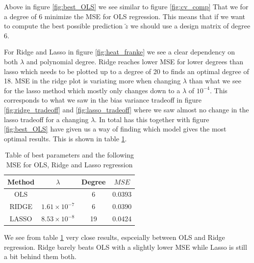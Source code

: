 \documentclass[12pt]{article}
\begin{document}
Above in figure \ref{fig:best_OLS} we see similar to figure \ref{fig:cv_comp} That we for a degree of 6 minimize the MSE for OLS regression. This means that if we want to compute the best possible prediction $\tilde{z}$ we should use a design matrix of degree 6.

For Ridge and Lasso in figure \ref{fig:heat_franke} we see a clear dependency on both $\lambda$ and polynomial degree. Ridge reaches lower MSE for lower degrees than lasso which needs to be plotted up to a degree of 20 to finds an optimal degree of 18. MSE in the ridge plot is variating more when changing $\lambda$ than what we see for the lasso method which mostly only changes down to a $\lambda$ of $10^{-4}$. This corresponds to what we saw in the bias variance tradeoff in figure \ref{fig:ridge_tradeoff} and \ref{fig:lasso_tradeoff} where we saw almost no change in the lasso tradeoff for a changing $\lambda$. In total has this together with figure \ref{fig:best_OLS} have given us a way of finding which model gives the most optimal results. This is shown in table \ref{tab:best_comp}.
\begin{table}[H]
  \centering
  \caption{Table of best parameters and the following MSE for OLS, Ridge and Lasso regression}
  \label{tab:best_comp}
  \begin{tabular}{|c||c|c|c|}
    \hline
    Method & $\lambda$ & Degree & $MSE$ \\
    \hline
    OLS &  & 6 & 0.0393 \\
    \hline
    RIDGE & $1.61\times10^{-7}$ & 6 & 0.0390 \\
    \hline
    LASSO & $8.53\times10^{-8}$ & 19 & 0.0424 \\
    \hline
  \end{tabular}
\end{table}
We see from table \ref{tab:best_comp} very close results, espceially between OLS and Ridge regression. Ridge barely beats OLS with a slightly lower MSE while Lasso is still a bit behind them both.
\end{document}
